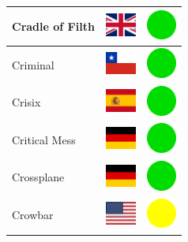 \documentclass[12pt, a4paper, twoside]{report}
\begin{document}
\begin{center}
\begin{longtable}{|p{5cm}|p{2cm}|p{2cm}|}
			Cradle of Filth & \includegraphics[width=1cm]{4x3/gb} & \includegraphics[width=1cm]{likes/y} \\ \hline
			Criminal & \includegraphics[width=1cm]{4x3/cl} & \includegraphics[width=1cm]{likes/y} \\ \hline
			Crisix & \includegraphics[width=1cm]{4x3/es} & \includegraphics[width=1cm]{likes/y} \\ \hline
			Critical Mess & \includegraphics[width=1cm]{4x3/de} & \includegraphics[width=1cm]{likes/y} \\ \hline
			Crossplane & \includegraphics[width=1cm]{4x3/de} & \includegraphics[width=1cm]{likes/y} \\ \hline
			Crowbar & \includegraphics[width=1cm]{4x3/us} & \includegraphics[width=1cm]{likes/m} \\ \hline

\end{longtable}
\end{center}
\end{document}

